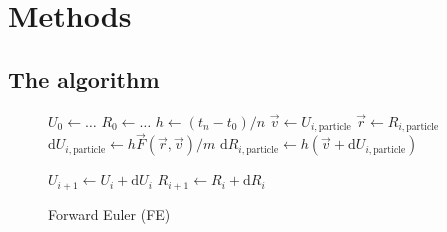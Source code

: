 \section{Methods}\label{sec:methods}
%

\subsection*{The algorithm}



\begin{figure}
    \begin{algorithm}[H]
    \scriptsize
    \caption{Forward Euler (FE)}
    \label{algo:FE}
        \begin{algorithmic}
            \State $U_0 \leftarrow \dots$         %
            \State $R_0 \leftarrow \dots$        
            \State $h \leftarrow (t_n-t_0)/n$  
            \State $\vec{v} \leftarrow U_{i,\text{particle}}$
            \State $\vec{r} \leftarrow R_{i,\text{particle}}$
            \State $\text{d}U_{i, \text{particle}} \leftarrow h \vec{F}(\vec{r}, \vec{v})/m$
            \State $\text{d}R_{i, \text{particle}} \leftarrow h (\vec{v} + \text{d}U_{i, \text{particle}})$ 
            \EndFor

            \State $U_{i+1} \leftarrow U_{i} + \text{d}U_{i}$ 
            \State $R_{i+1} \leftarrow R_{i} + \text{d}R_{i}$ 
            \EndFor
        \end{algorithmic}
    \end{algorithm}
\end{figure}


